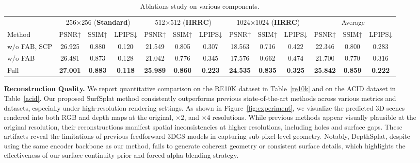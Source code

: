 \begin{table}[ht]
\centering
\caption{Ablations study on various components.}
\vspace{-10pt}
\label{ablation}
\fontsize{7}{11.5}\selectfont
\setlength{\tabcolsep}{4pt}
\begin{tabular}{lccc|ccc|ccc|ccc}
\toprule
& \multicolumn{3}{c|}{256$\times$256 (\textbf{Standard})} & \multicolumn{3}{c|}{512$\times$512 (\textbf{HRRC})} & \multicolumn{3}{c|}{1024$\times$1024 (\textbf{HRRC})} & \multicolumn{3}{c}{Average} \\
Method & PSNR↑ & SSIM↑ & LPIPS↓ & PSNR↑ & SSIM↑ & LPIPS↓ & PSNR↑ & SSIM↑ & LPIPS↓ & PSNR↑ & SSIM↑ & LPIPS↓ \\
\midrule
w/o FAB, SCP & 26.925 & 0.880 & 0.120 & 21.549 & 0.805 & 0.307 & 18.563 & 0.716 & 0.422 & 22.346 & 0.800 & 0.283 \\
w/o FAB & 26.481 & 0.873 & 0.128 & 21.042 & 0.776 & 0.345 & 17.576 & 0.662 & 0.474 & 21.700 & 0.770 & 0.316 \\
Full  & \textbf{27.001} & \textbf{0.883} & \textbf{0.118} & \textbf{25.989} & \textbf{0.860} & \textbf{0.223} & \textbf{24.535} & \textbf{0.835} & \textbf{0.325} & \textbf{25.842} & \textbf{0.859} & \textbf{0.222} \\
\bottomrule
\end{tabular}
\vspace{-18pt}
\end{table}

\noindent\textbf{Reconstruction Quality.}
We report quantitative comparison on the RE10K dataset in Table~\ref{re10k} and on the ACID dataset in Table~\ref{acid}. 
Our proposed SurfSplat method consistently outperforms previous state-of-the-art methods across various metrics and datasets, especially under high-resolution rendering settings. As shown in Figure~\ref{fig:experiment}, we visualize the predicted 3D scenes rendered into both RGB and depth maps at the original, $\times2$, and $\times4$ resolutions. 
While previous methods appear visually plausible at the original resolution, their reconstructions manifest spatial inconsistencies at higher resolutions, including holes and surface gaps.
These artifacts reveal the limitations of previous feedforward 3DGS models in capturing sub-pixel-level geometry. 
Notably, DepthSplat, despite using the same encoder backbone as our method, fails to generate coherent geometry or consistent surface details, which highlights the effectiveness of our surface continuity prior and forced alpha blending strategy.

